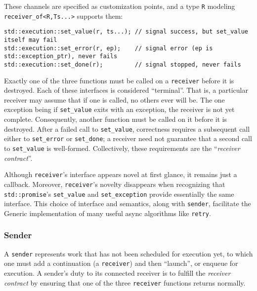 \documentclass[a4paper,12pt,notitlepage,twoside,openright]{article}
\begin{document}
These channels are specified as customization points, and a type
\texttt{R} modeling
\texttt{receiver_of<R,Ts...>} supports them:

\begin{verbatim}
std::execution::set_value(r, ts...); // signal success, but set_value itself may fail
std::execution::set_error(r, ep);    // signal error (ep is std::exception_ptr), never fails
std::execution::set_done(r);         // signal stopped, never fails
\end{verbatim}

Exactly one of the three functions must be called on a
\texttt{receiver} before it is destroyed. Each of these
interfaces is considered ``terminal''. That is, a particular receiver
may assume that if one is called, no others ever will be. The one
exception being if \texttt{set_value} exits with an
exception, the receiver is not yet complete. Consequently, another
function must be called on it before it is destroyed. After a failed
call to \texttt{set_value}, correctness requires a
subsequent call either to \texttt{set_error} or
\texttt{set_done}; a receiver need not guarantee that a
second call to \texttt{set_value} is well-formed.
Collectively, these requirements are the ``\emph{receiver contract}''.

Although \texttt{receiver}'s interface appears novel at
first glance, it remains just a callback. Moreover,
\texttt{receiver}'s novelty disappears when recognizing that
\texttt{std::promise}'s \texttt{set_value} and
\texttt{set_exception} provide essentially the same
interface. This choice of interface and semantics, along with
\texttt{sender}, facilitate the Generic implementation of
many useful async algorithms like \texttt{retry}.

\hypertarget{sender}{%
\subsubsection{Sender}\label{sender}}

A \texttt{sender} represents work that has not been
scheduled for execution yet, to which one must add a continuation (a
\texttt{receiver}) and then ``launch'', or enqueue for
execution. A sender's duty to its connected receiver is to fulfill the
\emph{receiver contract} by ensuring that one of the three
\texttt{receiver} functions returns normally.
\end{document}
